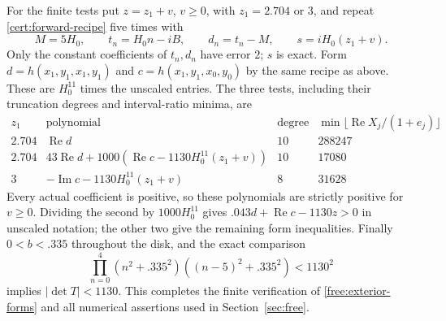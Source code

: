 \documentclass[11pt]{article}
\numberwithin{equation}{section}
\theoremstyle{definition}
\theoremstyle{remark}
\begin{document}
For the finite tests put $z=z_1+v$, $v\ge0$, with $z_1=2.704$ or
$3$, and repeat \eqref{cert:forward-recipe} five times with
\[
 M=5H_0,\qquad t_n=H_0n-iB,\qquad d_n=t_n-M,
 \qquad s=iH_0(z_1+v).
\]
Only the constant coefficients of $t_n,d_n$ have error $2$; $s$ is
exact.  Form $d=h(x_1,y_1,x_1,y_1)$ and
$c=h(x_1,y_1,x_0,y_0)$ by the same recipe as above.  These are
$H_0^{11}$ times the unscaled entries.  The three tests, including
their truncation degrees and interval-ratio minima, are
\begin{equation}\label{cert:exterior-table}
\begin{array}{c|l|c|r}
 z_1&\text{polynomial}&\text{degree}&
 \min\lfloor\operatorname{Re}X_j/(1+e_j)\rfloor\\\hline
 2.704&\operatorname{Re}d&10&288247\\
 2.704&43\operatorname{Re}d+
 1000(\operatorname{Re}c-1130H_0^{11}(z_1+v))&10&17080\\
 3&-\operatorname{Im}c-1130H_0^{11}(z_1+v)&8&31628
\end{array}
\end{equation}
Every actual coefficient is positive, so these polynomials are
strictly positive for $v\ge0$.  Dividing the second by
$1000H_0^{11}$ gives $.043d+\operatorname{Re}c-1130z>0$ in
unscaled notation; the other two give the remaining form inequalities.
Finally $0<b<.335$ throughout the disk, and the exact comparison
\begin{equation}\label{cert:exterior-determinant}
 \prod_{n=0}^4(n^2+.335^2)((n-5)^2+.335^2)<1130^2
\end{equation}
implies $|\det T|<1130$.  This completes the finite verification of
\eqref{free:exterior-forms} and all numerical assertions used in
Section~\ref{sec:free}.




\end{document}
